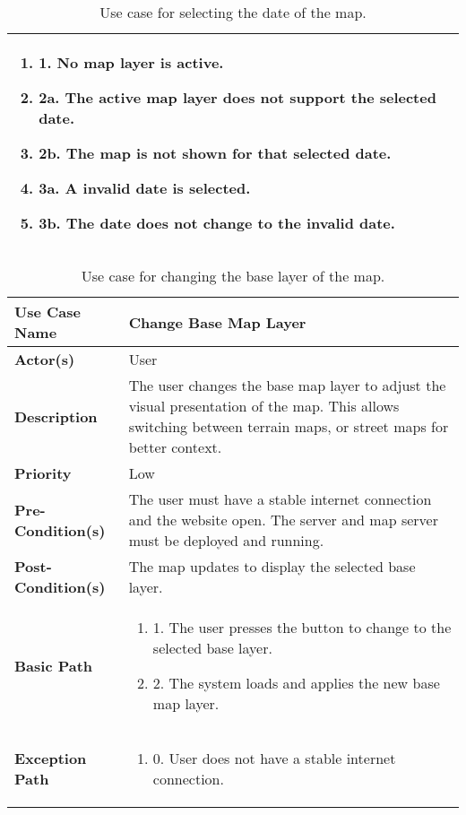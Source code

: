 \begin{table}[h]
\begin{tabularx}{\textwidth}{|l|X|}
\begin{enumerate}[label=,left=0pt]
            \item 1. No map layer is active.
            \item 2a. The active map layer does not support the selected date.
            \item 2b. The map is not shown for that selected date.
            \item 3a. A invalid date is selected.
            \item 3b. The date does not change to the invalid date.
        \end{enumerate} \\
        \hline
    \end{tabularx}
    \caption[Use Case Specification: Select Map Date]{Use case for selecting the date of the map.}
    \label{tab:use_case_date_map_appendix}
\end{table}

\begin{table}[h]
    \centering
    \renewcommand{\arraystretch}{1.5}
    \begin{tabularx}{\textwidth}{|l|X|}
        \hline
        \rowcolor{gray!20}
        \textbf{Use Case Name} & Change Base Map Layer \\
        \hline
        \textbf{Actor(s)} & User \\
        \hline
        \textbf{Description} & The user changes the base map layer to adjust the visual presentation of the map. This allows switching between terrain maps, or street maps for better context. \\
        \hline
        \textbf{Priority} & Low \\
        \hline
        \textbf{Pre-Condition(s)} & The user must have a stable internet connection and the website open. The server and map server must be deployed and running. \\
        \hline
        \textbf{Post-Condition(s)} & The map updates to display the selected base layer. \\
        \hline
        \textbf{Basic Path} &  
        \begin{enumerate}[label=,left=0pt]
            \item 1. The user presses the button to change to the selected base layer.
            \item 2. The system loads and applies the new base map layer.
        \end{enumerate} \\
        \hline
        \textbf{Exception Path} & 
        \begin{enumerate}[label=,left=0pt]
            \item 0. User does not have a stable internet connection.
        \end{enumerate} \\
        \hline
    \end{tabularx}
    \caption[Use Case Specification: Change Base Map Layer]{Use case for changing the base layer of the map.}
    \label{tab:use_case_base_layer_appendix}
\end{table}